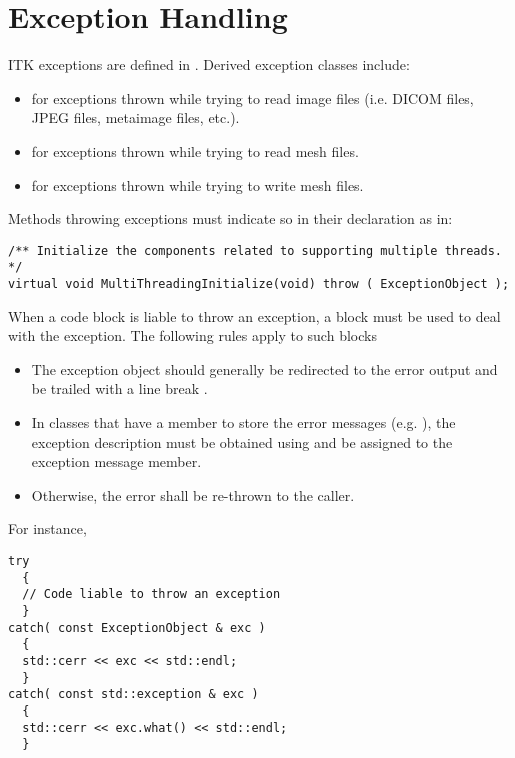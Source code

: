 \section{Exception Handling}
\label{sec:ExceptionHandling}

ITK exceptions are defined in . Derived exception
classes include:
\begin{itemize}
\item {} for exceptions thrown while trying to
read image files (i.e. DICOM files, JPEG files, metaimage files, etc.).
\item {} for exceptions thrown while trying to
read mesh files.
\item {} for exceptions thrown while trying to
write mesh files.
\end{itemize}

Methods throwing exceptions must indicate so in their declaration as in:

\small
\begin{verbatim}
/** Initialize the components related to supporting multiple threads. */
virtual void MultiThreadingInitialize(void) throw ( ExceptionObject );
\end{verbatim}
\normalsize

When a code block is liable to throw an exception, a  block must
be used to deal with the exception. The following rules apply to such blocks
\begin{itemize}
\item The exception object should generally be redirected to the error output
 and be trailed with a line break .
\item In classes that have a member to store the error messages (e.g.
), the exception description must be obtained using
 and be assigned to the exception message member.
\item Otherwise, the error shall be re-thrown to the caller.
\end{itemize}

For instance,

\small
\begin{verbatim}
try
  {
  // Code liable to throw an exception
  }
catch( const ExceptionObject & exc )
  {
  std::cerr << exc << std::endl;
  }
catch( const std::exception & exc )
  {
  std::cerr << exc.what() << std::endl;
  }
\end{verbatim}
\normalsize

